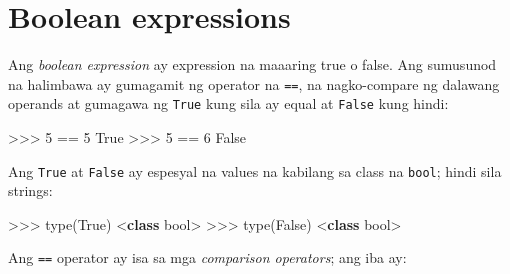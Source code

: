 \documentclass[10pt,]{book}
\newenvironment{Shaded}{}{}
\newcommand{\BuiltInTok}[1]{\textcolor[rgb]{0.00,0.50,0.00}{#1}}
\newcommand{\DecValTok}[1]{\textcolor[rgb]{0.25,0.63,0.44}{#1}}
\newcommand{\KeywordTok}[1]{\textcolor[rgb]{0.00,0.44,0.13}{\textbf{#1}}}
\newcommand{\NormalTok}[1]{#1}
\newcommand{\OperatorTok}[1]{\textcolor[rgb]{0.40,0.40,0.40}{#1}}
\newcommand{\StringTok}[1]{\textcolor[rgb]{0.25,0.44,0.63}{#1}}
\newcommand{\VariableTok}[1]{\textcolor[rgb]{0.10,0.09,0.49}{#1}}
\begin{document}
\section{Boolean expressions}\label{boolean-expressions}

 
 

Ang \emph{boolean expression} ay expression na maaaring true o false.
Ang sumusunod na halimbawa ay gumagamit ng operator na \texttt{==}, na
nagko-compare ng dalawang operands at gumagawa ng \texttt{True} kung
sila ay equal at \texttt{False} kung hindi:

\begin{Shaded}
\begin{Highlighting}[]
\OperatorTok{\textgreater{}\textgreater{}\textgreater{}} \DecValTok{5} \OperatorTok{==} \DecValTok{5}
\VariableTok{True}
\OperatorTok{\textgreater{}\textgreater{}\textgreater{}} \DecValTok{5} \OperatorTok{==} \DecValTok{6}
\VariableTok{False}
\end{Highlighting}
\end{Shaded}

Ang \texttt{True} at \texttt{False} ay espesyal na values na kabilang sa
class na \texttt{bool}; hindi sila strings:

 
  

\begin{Shaded}
\begin{Highlighting}[]
\OperatorTok{\textgreater{}\textgreater{}\textgreater{}} \BuiltInTok{type}\NormalTok{(}\VariableTok{True}\NormalTok{)}
\OperatorTok{\textless{}}\KeywordTok{class} \StringTok{\textquotesingle{}bool\textquotesingle{}}\OperatorTok{\textgreater{}}
\OperatorTok{\textgreater{}\textgreater{}\textgreater{}} \BuiltInTok{type}\NormalTok{(}\VariableTok{False}\NormalTok{)}
\OperatorTok{\textless{}}\KeywordTok{class} \StringTok{\textquotesingle{}bool\textquotesingle{}}\OperatorTok{\textgreater{}}
\end{Highlighting}
\end{Shaded}

Ang \texttt{==} operator ay isa sa mga \emph{comparison operators}; ang
iba ay:
\end{document}
